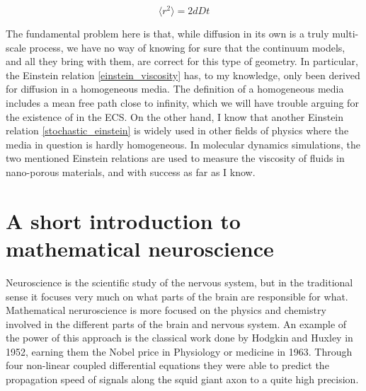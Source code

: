 \begin{equation}\label{stochastic_einstein}
\langle r^2\rangle = 2dDt 
\end{equation}

The fundamental problem here is that, while diffusion in its own is a truly multi-scale process, we have no way of knowing for sure that the continuum models, and all they bring with them, are correct for this type of geometry. 
In particular, the Einstein relation \ref{einstein_viscosity} has, to my knowledge, only been derived for diffusion in a homogeneous media. 
The definition of a homogeneous media includes a mean free path close to infinity, which we will have trouble arguing for the existence of in the ECS. 
On the other hand, I know that another Einstein relation \ref{stochastic_einstein} is widely used  in other fields of physics where the media in question is hardly homogeneous. 
In molecular dynamics simulations, the two mentioned Einstein relations are used to measure the viscosity of fluids in nano-porous materials, and with success as far as I know.

\section{A short introduction to mathematical neuroscience}

Neuroscience is the scientific study of the nervous system, but in the traditional sense it focuses very much on what parts of the brain are responsible for what. 
Mathematical neruroscience is more focused on the physics and chemistry involved in the different parts of the brain and nervous system. 
An example of the power of this approach is the classical work done by Hodgkin and Huxley in 1952, earning them the Nobel price in Physiology or medicine in 1963. 
Through four non-linear coupled differential equations they were able to predict the propagation speed of signals along the squid giant axon to a quite high precision. \\


